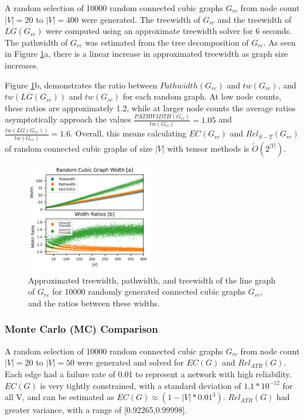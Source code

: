 A random selection of 10000 random connected cubic graphs \(G_{rc}\) from node count \(|V|=20\) to \(|V|=400\) were generated. The treewidth of \(G_{rc}\) and the treewidth of \(LG(G_{rc})\) were computed using an approximate treewidth solver \cite{dell2018pace} for 6 seconds. The pathwidth of \(G_{rc}\) was estimated from the tree decomposition of \(G_{rc}\). As seen in Figure \ref{fig:Random Cubic Treewidth}a, there is a linear increase in approximated treewidth as graph size increases.

Figure \ref{fig:Random Cubic Treewidth}b, demonstrates the ratio between \(Pathwidth(G_{rc})\) and \(tw(G_{rc})\), and \(tw(LG(G_{rc}))\) and \(tw(G_{rc})\) for each random graph. At low node counts, these ratios are approximately 1.2, while at larger node counts the average ratios asymptotically approach the values \(\frac{PATHWIDTH(G_{rc})}{tw(G_{rc})}=1.05\) and \(\frac{tw(LG(G_{rc}))}{tw(G_{rc})}=1.6\). Overall, this means calculating \(EC(G_{rc})\) and \(Rel_{S-T}(G_{rc})\) of random connected cubic graphs of size \(|V|\) with tensor methods is \(\widetilde{O}(2^{|V|})\).

\begin{figure}[t]
\caption{Approximated treewidth, pathwidth, and treewidth of the line graph of $G_{rc}$ for 10000 randomly generated connected cubic graphs $G_{rc}$, and the ratios between these widths.}
\label{fig:Random Cubic Treewidth}
\includegraphics[width=0.5\textwidth]{../figures/RcubicWidth.png}
\end{figure}

\hypertarget{monte-carlo-mc-comparison-1}{%
\subsubsection{Monte Carlo (MC) Comparison}\label{monte-carlo-mc-comparison-1}}

A random selection of 10000 random connected cubic graphs \(G_{rc}\) from node count \(|V|=20\) to \(|V|=50\) were generated and solved for \(EC(G)\) and \(Rel_{ATR}(G)\). Each edge had a failure rate of 0.01 to represent a network with high reliability. \(EC(G)\) is very tightly constrained, with a standard deviation of \(1.1*10^{-12}\) for all \textbar V\textbar, and can be estimated as \(EC(G) \approx (1-|V|*0.01^3)\). \(Rel_{ATR}(G)\) had greater variance, with a range of {[}0.92265,0.99998{]}.

